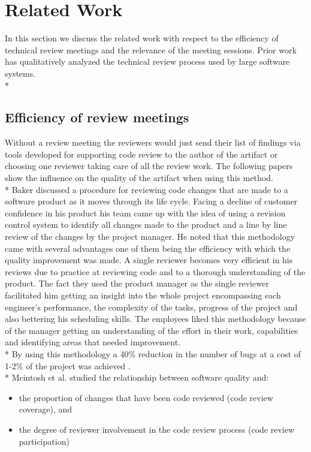 \section{Related Work}
In this section we discuss the related work with respect to the efficiency of technical review meetings and the relevance of the meeting sessions. Prior work has qualitatively analyzed the technical review process used by large software systems. \\*

\subsection{Efficiency of review meetings}
Without a review meeting the reviewers would just send their list of findings via tools developed for supporting code review to the author of the artifact or choosing one reviewer taking care of all the review work. The following papers show the influence on the quality of the artifact when using this method. \\* 
Baker discussed a procedure for reviewing code changes that are made to a software product as it moves through its life cycle. Facing a decline of customer confidence in his product his team came up with the idea of using a revision control system to identify all changes made to the product and a line by line review of the changes by the project manager. He noted that this methodology came with several advantages one of them being the efficiency with which the quality improvement was made. A single reviewer becomes very efficient in his reviews due to practice at reviewing code and to a thorough understanding of the product. The fact they used the product manager as the single reviewer facilitated him getting an insight into the whole project encompassing each engineer's performance, the complexity of the tasks, progress of the project and also bettering his scheduling skills. The employees liked this methodology because of the manager getting an understanding of the effort in their work, capabilities and identifying areas that needed improvement. \\*
By using this methodology a 40\% reduction in the number of bugs at a cost of 1-2\% of the project was achieved \cite{Baker:1997:CRE:253228.253461}. \\*
Mcintosh et al. studied the relationship between software quality and:
\begin{itemize}
	\item the proportion of changes that have been code reviewed (code review coverage), and
	\item the degree of reviewer involvement in the code review process (code review participation)
\end{itemize}
